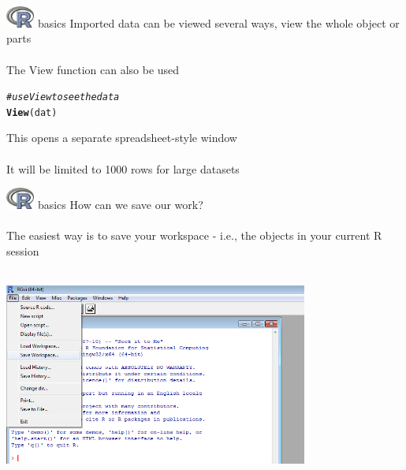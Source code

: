 \documentclass[xcolor=svgnames]{beamer}\usepackage[]{graphicx}\usepackage[]{color}
\makeatletter
\newcommand{\hlcom}[1]{\textcolor[rgb]{0.678,0.584,0.686}{\textit{#1}}}%
\newcommand{\hlstd}[1]{\textcolor[rgb]{0.345,0.345,0.345}{#1}}%
\newcommand{\hlkwd}[1]{\textcolor[rgb]{0.737,0.353,0.396}{\textbf{#1}}}%
\newenvironment{kframe}{%
 \def\at@end@of@kframe{}%
 \ifinner\ifhmode%
  \def\at@end@of@kframe{\end{minipage}}%
  \begin{minipage}{\columnwidth}%
 \fi\fi%
 \def\FrameCommand##1{\hskip\@totalleftmargin \hskip-\fboxsep
 \colorbox{shadecolor}{##1}\hskip-\fboxsep
     \hskip-\linewidth \hskip-\@totalleftmargin \hskip\columnwidth}%
 \MakeFramed {\advance\hsize-\width
   \@totalleftmargin\z@ \linewidth\hsize
   \@setminipage}}%
 {\par\unskip\endMakeFramed%
 \at@end@of@kframe}
\newenvironment{knitrout}{}{} %
\makeatother
\begin{document}
\begin{frame}[t,fragile]{\includegraphics[width=0.07\textwidth]{Rlogo.jpg} \hspace{0.01in} basics}
Imported data can be viewed several ways, view the whole object or parts \\~\\
The View function can also be used
\begin{knitrout}\scriptsize
{}\color{fgcolor}\begin{kframe}
\begin{alltt}
\hlcom{# use View to see the data}
\hlkwd{View}\hlstd{(dat)}
\end{alltt}
\end{kframe}
\end{knitrout}
This opens a separate spreadsheet-style window\\~\\
It will be limited to 1000 rows for large datasets
\end{frame}

\begin{frame}[t,fragile]{\includegraphics[width=0.07\textwidth]{Rlogo.jpg} \hspace{0.01in} basics}
How can we save our work?\\~\\
The easiest way is to save your workspace - i.e., the objects in your current R session\\~\\
\centerline{\includegraphics[width = 0.75\textwidth]{savework.png}}
\end{frame}
\end{document}
